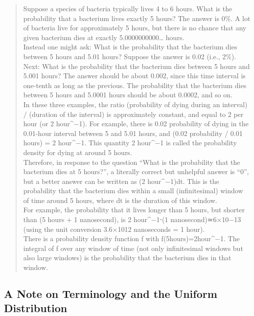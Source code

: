 \documentclass[]{book}
\theoremstyle{definition}
\theoremstyle{definition}
\theoremstyle{definition}
\theoremstyle{remark}
\begin{document}
\begin{quote}
Suppose a species of bacteria typically lives 4 to 6 hours. What is the
probability that a bacterium lives exactly 5 hours? The answer is 0\%. A
lot of bacteria live for approximately 5 hours, but there is no chance
that any given bacterium dies at exactly 5.0000000000\ldots{} hours.\\
Instead one might ask: What is the probability that the bacterium dies
between 5 hours and 5.01 hours? Suppose the answer is 0.02 (i.e., 2\%).
Next: What is the probability that the bacterium dies between 5 hours
and 5.001 hours? The answer should be about 0.002, since this time
interval is one-tenth as long as the previous. The probability that the
bacterium dies between 5 hours and 5.0001 hours should be about 0.0002,
and so on.\\
In these three examples, the ratio (probability of dying during an
interval) / (duration of the interval) is approximately constant, and
equal to 2 per hour (or 2 hour\^{}−1). For example, there is 0.02
probability of dying in the 0.01-hour interval between 5 and 5.01 hours,
and (0.02 probability / 0.01 hours) = 2 hour\^{}−1. This quantity 2
hour\^{}−1 is called the probability density for dying at around 5
hours.\\
Therefore, in response to the question ``What is the probability that
the bacterium dies at 5 hours?'', a literally correct but unhelpful
answer is ``0'', but a better answer can be written as (2 hour\^{}−1)dt.
This is the probability that the bacterium dies within a small
(infinitesimal) window of time around 5 hours, where dt is the duration
of this window.\\
For example, the probability that it lives longer than 5 hours, but
shorter than (5 hours + 1 nanosecond), is 2 hour\^{}−1⋅(1
nanosecond)≃6×10−13 (using the unit conversion 3.6×1012 nanoseconds = 1
hour).\\
There is a probability density function f with f(5hours)=2hour\^{}−1.
The integral of f over any window of time (not only infinitesimal
windows but also large windows) is the probability that the bacterium
dies in that window.
\end{quote}

\subsection{A Note on Terminology and the Uniform
Distribution}\label{a-note-on-terminology-and-the-uniform-distribution}
\end{document}
